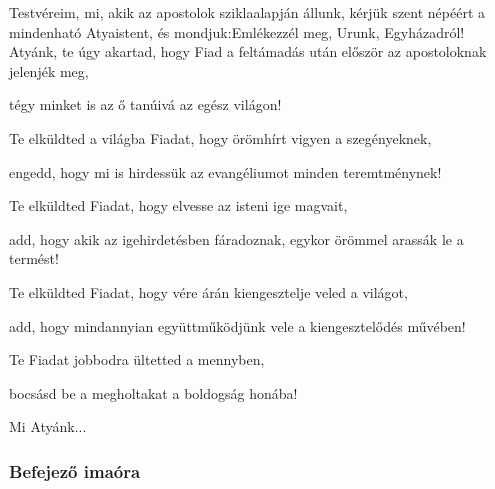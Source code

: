 \documentclass[twoside]{article}
\begin{document}
\begin{preces}{Testvéreim, mi, akik az apostolok sziklaalapján állunk, kérjük szent népéért a mindenható Atyaistent, és mondjuk:}{Emlékezzél meg, Urunk, Egyházadról!}
  Atyánk, te úgy akartad, hogy Fiad a feltámadás után először az apostoloknak jelenjék meg,

  \reddash tégy minket is az ő tanúivá az egész világon!

  Te elküldted a világba Fiadat, hogy örömhírt vigyen a szegényeknek,

  \reddash engedd, hogy mi is hirdessük az evangéliumot minden teremtménynek!

  Te elküldted Fiadat, hogy elvesse az isteni ige magvait,

  \reddash add, hogy akik az igehirdetésben fáradoznak, egykor örömmel arassák le a termést!

  Te elküldted Fiadat, hogy vére árán kiengesztelje veled a világot,

  \reddash add, hogy mindannyian együttműködjünk vele a kiengesztelődés művében!

  Te Fiadat jobbodra ültetted a mennyben,

  \reddash bocsásd be a megholtakat a boldogság honába!
\end{preces}
Mi Atyánk...


\subsubsection*{Befejező imaóra}
\end{document}

